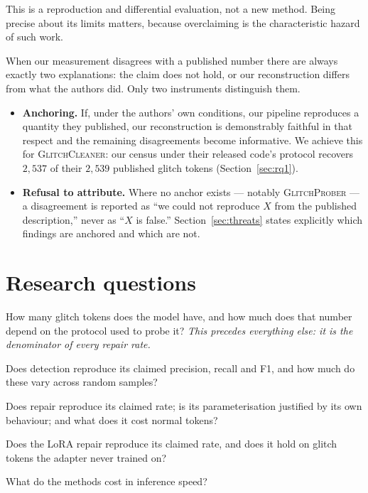 \documentclass[11pt,a4paper]{article}
\newcommand{\gp}{\textsc{GlitchProber}}
\newcommand{\gc}{\textsc{GlitchCleaner}}
\begin{document}
This is a reproduction and differential evaluation, not a new method. Being
precise about its limits matters, because overclaiming is the characteristic
hazard of such work.

When our measurement disagrees with a published number there are always exactly
two explanations: the claim does not hold, or our reconstruction differs from what
the authors did. Only two instruments distinguish them.

\begin{itemize}[leftmargin=*]
\item \textbf{Anchoring.} If, under the authors' own conditions, our pipeline
reproduces a quantity they published, our reconstruction is demonstrably faithful
in that respect and the remaining disagreements become informative. We achieve
this for \gc{}: our census under their released code's protocol recovers $2{,}537$
of their $2{,}539$ published glitch tokens (Section~\ref{sec:rq1}).
\item \textbf{Refusal to attribute.} Where no anchor exists --- notably \gp{} ---
a disagreement is reported as ``we could not reproduce $X$ from the published
description,'' never as ``$X$ is false.'' Section~\ref{sec:threats} states
explicitly which findings are anchored and which are not.
\end{itemize}

\section{Research questions}

\begin{description}[leftmargin=1.5cm,style=nextline]
\item[RQ1 --- Population] How many glitch tokens does the model have, and how much
does that number depend on the protocol used to probe it? \emph{This precedes
everything else: it is the denominator of every repair rate.}
\item[RQ2 --- \gp{} detection] Does detection reproduce its claimed precision,
recall and F1, and how much do these vary across random samples?
\item[RQ3 --- \gp{} repair] Does repair reproduce its claimed rate; is its
parameterisation justified by its own behaviour; and what does it cost normal
tokens?
\item[RQ4 --- \gc{} repair] Does the LoRA repair reproduce its claimed rate, and
does it hold on glitch tokens the adapter never trained on?
\item[RQ5 --- Side effects] What do the methods cost in inference speed?
\end{description}
\end{document}
